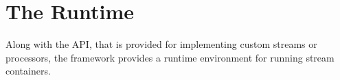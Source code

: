 \section{\label{sec:streamsRuntime}The \streams Runtime}
Along with the \streams API, that is provided for implementing custom
streams or processors, the \streams framework provides a runtime
environment for running stream containers.


